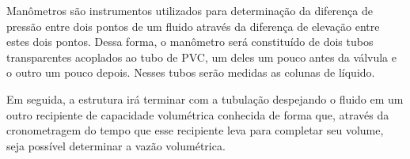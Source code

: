 Manômetros são instrumentos utilizados para determinação da diferença de 
pressão entre dois pontos de um fluido através
da diferença de elevação entre estes dois pontos. Dessa forma, o manômetro 
será constituído de dois tubos transparentes
acoplados ao tubo de PVC, um deles um pouco antes da válvula e o outro um 
pouco depois. Nesses tubos serão medidas as colunas de líquido. 

Em seguida, a estrutura irá terminar com a tubulação despejando o fluido em um 
outro recipiente de capacidade
volumétrica conhecida de forma que, através da cronometragem do tempo que esse 
recipiente leva para completar seu volume, seja possível 
determinar a vazão volumétrica. 


